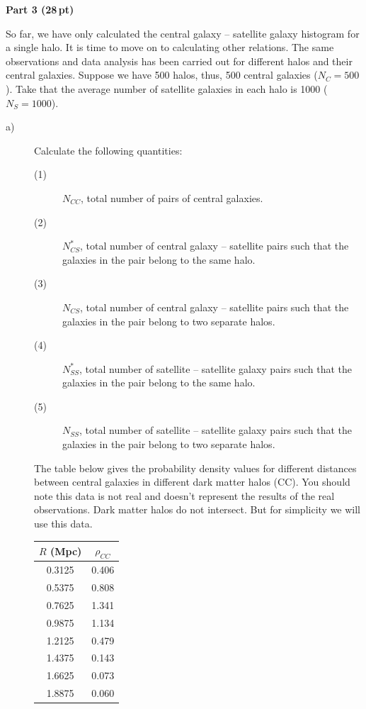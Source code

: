 \medskip
\textbf{Part 3 (28\,pt)}

So far, we have only calculated the central galaxy -- satellite galaxy
histogram for a single halo. It is time to move on to calculating other
relations. The same observations and data analysis has been carried out for
different halos and their central galaxies. Suppose we have 500 halos, thus,
500 central galaxies ($N_C = 500$). Take that the average number of satellite
galaxies in each halo is 1000 ($N_S = 1000$).

\begin{description}
\item[a)] Calculate the following quantities:
  \begin{description}
  \item[(1)] $N_{CC}$, total number of pairs of central galaxies.
  \item[(2)] $N_{CS}^*$, total number of central galaxy -- satellite pairs
    such that the galaxies in the pair belong to the same halo.
  \item[(3)] $N_{CS}$, total number of central galaxy -- satellite pairs such
    that the galaxies in the pair belong to two separate halos.
  \item[(4)] $N_{SS}^*$, total number of satellite -- satellite galaxy pairs
    such that the galaxies in the pair belong to the same halo.
  \item[(5)] $N_{SS}$, total number of satellite -- satellite galaxy pairs
    such that the galaxies in the pair belong to two separate halos.
  \end{description}

  The table below gives the probability density values for different distances
  between central galaxies in different dark matter halos (CC). You should
  note this data is not real and doesn't represent the results of the real
  observations. Dark matter halos do not intersect. But for simplicity we will
  use this data.

  \begin{center}
  \begin{tabular}{cc}
  $R$ (Mpc) & $\rho_{CC}$ \\
  \hline
  0.3125 & 0.406 \\
  0.5375 & 0.808 \\
  0.7625 & 1.341 \\
  0.9875 & 1.134 \\
  1.2125 & 0.479 \\
  1.4375 & 0.143 \\
  1.6625 & 0.073 \\
  1.8875 & 0.060 \\
  \end{tabular}
  \end{center}


\end{description}
